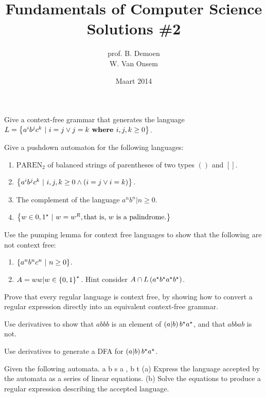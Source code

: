 \documentclass{article}
\title{Fundamentals of Computer Science\\Solutions \#2}
\author{prof. B. Demoen\\W. Van Onsem}
\date{Maart 2014}
\begin{document}
\maketitle
\begin{exercise}
Give a context-free grammar that generates the language $L=\left\{ a^ib^jc^k\ |\ i=j\vee j=k \mbox{\bf{ where }} i,j,k\geq0 \right\}$.
\end{exercise}

\begin{exercise}
Give a pushdown automaton for the following languages:
\begin{enumerate}
 \item $\mbox{PAREN}_2$ of balanced strings of parentheses of two types $()$ and $[]$.
 \item $\left\{ a^ib^jc^k\ |\ i,j,k\geq0\wedge \left( i=j\vee i=k \right) \right\}$.
 \item The complement of the language ${a^nb^n|n\geq 0}$.
 \item $\left\{ w\in{0,1}^{\star}\ |\ w=w^R, \mbox{that is, $w$ is a palindrome.} \right\}$
\end{enumerate}
\end{exercise}

\begin{exercise}
Use the pumping lemma for context free languages to show that the following are not context free:
\begin{enumerate}
 \item $\left\{ a^nb^nc^n\ |\ n\geq0 \right\}$.
 \item $A = {ww|w\in\left\{ 0,1 \right\}^\star{}}$. Hint consider $A\cap L\left( a^{\star}b^{\star}a^{\star}b^{\star} \right)$.
\end{enumerate}
\end{exercise}

\begin{exercise}
Prove that every regular language is context free, by showing how to convert a regular expression directly into an equivalent context-free grammar.
\end{exercise}

\begin{exercise}
Use derivatives to show that $abbb$ is an element of $\left( a|b \right)b^{\star}a^{\star}$, and that $abbab$ is not.
\end{exercise}

\begin{exercise}
Use derivatives to generate a DFA for $\left( a|b \right)b^{\star}a^{\star}$.
\end{exercise}

\begin{exercise}
Given the following automata.
a
b
s
a , b
t
(a) Express the language accepted by the automata as a series of linear equations.
(b) Solve the equations to produce a regular expression describing the accepted language.

\end{exercise}
\end{document}

